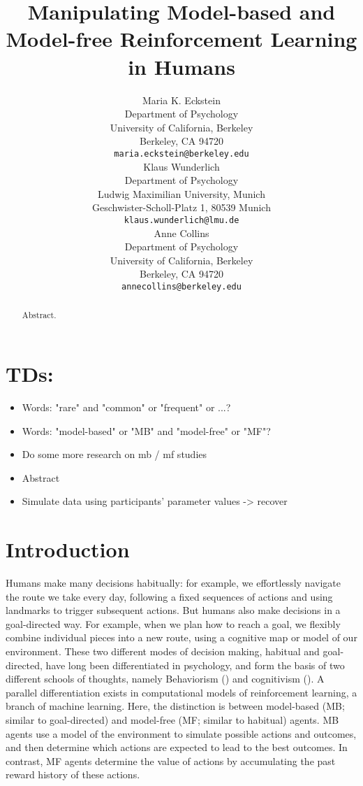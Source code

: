 \documentclass[11pt]{article} %
\title{Manipulating Model-based and Model-free Reinforcement Learning in Humans}
\author{
Maria K. Eckstein \\
Department of Psychology \\
University of California, Berkeley \\
Berkeley, CA 94720 \\
\texttt{maria.eckstein@berkeley.edu} \\
\And
Klaus Wunderlich \\
Department of Psychology \\
Ludwig Maximilian University, Munich \\
Geschwister-Scholl-Platz 1, 80539 Munich \\
\texttt{klaus.wunderlich@lmu.de} \\
\And
Anne Collins \\
Department of Psychology\\
University of California, Berkeley \\
Berkeley, CA 94720  \\
\texttt{annecollins@berkeley.edu} \\
}
\begin{document}
\maketitle

\begin{abstract}
Abstract. 
\end{abstract}




\section*{TDs:}
\begin{itemize}
	\item Words: "rare" and "common" or "frequent" or ...?
	\item Words: "model-based" or "MB" and "model-free" or "MF"?
	\item Do some more research on mb / mf studies
	\item Abstract
	\item Simulate data using participants' parameter values -> recover
\end{itemize}

\startmain

\section{Introduction}

Humans make many decisions habitually: for example, we effortlessly navigate the route we take every day, following a fixed sequences of actions and using landmarks to trigger subsequent actions. But humans also make decisions in a goal-directed way. For example, when we plan how to reach a goal, we flexibly combine individual pieces into a new route, using a cognitive map or model of our environment. These two different modes of decision making, habitual and goal-directed, have long been differentiated in psychology, and form the basis of two different schools of thoughts, namely Behaviorism (\cite{skinner_why_1977}) and cognitivism (\cite{tolman_cognitive_1948}). A parallel differentiation exists in computational models of reinforcement learning, a branch of machine learning. Here, the distinction is between model-based (MB; similar to goal-directed) and model-free (MF; similar to habitual) agents. MB agents use a model of the environment to simulate possible actions and outcomes, and then determine which actions are expected to lead to the best outcomes. In contrast, MF agents determine the value of actions by accumulating the past reward history of these actions.
\end{document}
